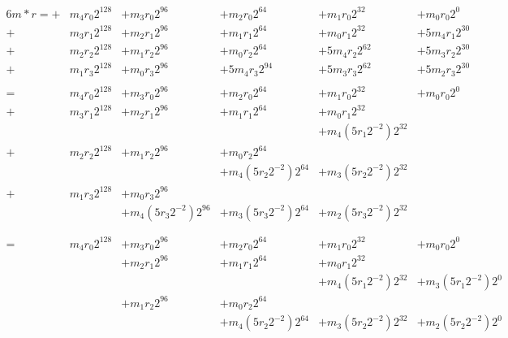 \documentclass[12pt]{article}
\begin{document}
\begin{alignat*}{6}
  m \ast r =
  + & m_{4}r_{0}2^{128} & + m_{3}r_{0}2^{96} & + m_{2}r_{0}2^{64}  & + m_{1}r_{0}2^{32}  & + m_{0}r_{0}2^0\\
  + & m_{3}r_{1}2^{128} & + m_{2}r_{1}2^{96} & + m_{1}r_{1}2^{64}  & + m_{0}r_{1}2^{32}  & + 5m_{4}r_{1}2^{30} \\
  + & m_{2}r_{2}2^{128} & + m_{1}r_{2}2^{96} & + m_{0}r_{2}2^{64}  & + 5m_{4}r_{2}2^{62} & + 5m_{3}r_{2}2^{30}\\
  + & m_{1}r_{3}2^{128} & + m_{0}r_{3}2^{96} & + 5m_{4}r_{3}2^{94} & + 5m_{3}r_{3}2^{62} & + 5m_{2}r_{3}2^{30} \\
  \\
 =
    & m_{4}r_{0}2^{128} & + m_{3}r_{0}2^{96}          & + m_{2}r_{0}2^{64}          & + m_{1}r_{0}2^{32}          &    + m_{0}r_{0}2^0\\
  + & m_{3}r_{1}2^{128} & + m_{2}r_{1}2^{96}          & + m_{1}r_{1}2^{64}          & + m_{0}r_{1}2^{32}  \\
    &                   &                             &                             & + m_{4}(5r_{1}2^{-2})2^{32} \\
  + & m_{2}r_{2}2^{128} & + m_{1}r_{2}2^{96}          & + m_{0}r_{2}2^{64}  \\
    &                   &                             & + m_{4}(5r_{2}2^{-2})2^{64} & + m_{3}(5r_{2}2^{-2})2^{32}\\
  + & m_{1}r_{3}2^{128} & + m_{0}r_{3}2^{96} \\
    &                   & + m_{4}(5r_{3}2^{-2})2^{96} & + m_{3}(5r_{3}2^{-2})2^{64} & + m_{2}(5r_{3}2^{-2})2^{32} \\
  \\ \\
 =
    & m_{4}r_{0}2^{128} & + m_{3}r_{0}2^{96}          & + m_{2}r_{0}2^{64}          & + m_{1}r_{0}2^{32}            & + m_{0}r_{0}2^0\\
    &                   & + m_{2}r_{1}2^{96}          & + m_{1}r_{1}2^{64}          & + m_{0}r_{1}2^{32}  \\
    &                   &                             &                             & + m_{4}(5r_{1}2^{-2})2^{32}   & + m_{3}(5r_{1}2^{-2})2^0\\
    &                   & + m_{1}r_{2}2^{96}          & + m_{0}r_{2}2^{64}  \\
    &                   &                             & + m_{4}(5r_{2}2^{-2})2^{64} & + m_{3}(5r_{2}2^{-2})2^{32}   & + m_{2}(5r_{2}2^{-2})2^0 \\

\end{alignat*}
\end{document}
